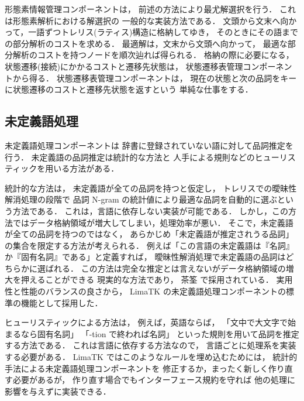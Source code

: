 形態素情報管理コンポーネントは，
前述の方法により最尤解選択を行う．
これは形態素解析における解選択の
一般的な実装方法である\cite{永田97}\cite{長尾96}．
文頭から文末へ向かって，一語ずつトレリス(ラティス)構造に格納してゆき，
そのときにその語までの部分解析のコストを求める．
最適解は，文末から文頭へ向かって，
最適な部分解析のコストを持つノードを順次辿れば得られる．
格納の際に必要になる，
状態遷移(接続)にかかるコストと遷移先状態は，
状態遷移表管理コンポーネントから得る．
状態遷移表管理コンポーネントは，
現在の状態と次の品詞をキーに状態遷移のコストと遷移先状態を返すという
単純な仕事をする．



\subsection{未定義語処理}\label{comp:udw}

未定義語処理コンポーネントは
辞書に登録されていない語に対して品詞推定を行う．
未定義語の品詞推定は統計的な方法と
人手による規則などのヒューリスティックを用いる方法がある．

統計的な方法は，
未定義語が全ての品詞を持つと仮定し，
トレリスでの曖昧性解消処理の段階で
品詞 N-gram の統計値により最適な品詞を自動的に選ぶという方法である\cite{Manning99}．
これは，言語に依存しない実装が可能である．
しかし，この方法ではデータ格納領域が増大してしまい，処理効率が悪い．
そこで，未定義語が全ての品詞を持つのではなく，
あらかじめ「未定義語が推定されうる品詞」の集合を限定する方法が考えられる．
例えば「この言語の未定義語は『名詞』か『固有名詞』である」と定義すれば，
曖昧性解消処理で未定義語の品詞はどちらかに選ばれる．
この方法は完全な推定とは言えないがデータ格納領域の増大を押えることができる
現実的な方法であり，
茶筌\cite{ChaSen99} で採用されている．
実用性と性能のバランスの良さから，
LimaTK の未定義語処理コンポーネントの標準の機能として採用した．

ヒューリスティックによる方法は，
例えば，英語ならば，
「文中で大文字で始まるなら固有名詞」
「-tion で終われば名詞」
といった規則を用いて品詞を推定する方法である．
これは言語に依存する方法なので，
言語ごとに処理系を実装する必要がある．
LimaTK ではこのようなルールを埋め込むためには，
統計的手法による未定義語処理コンポーネントを
修正するか，まったく新しく作り直す必要があるが，
作り直す場合でもインターフェース規約を守れば
他の処理に影響を与えずに実装できる．

